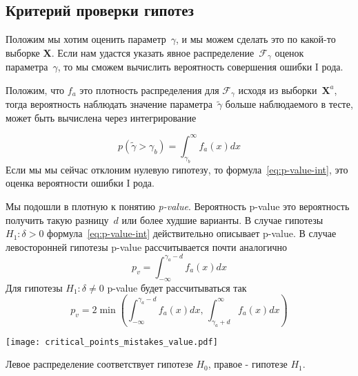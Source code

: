 \documentclass[../handbook.tex]{subfiles}
\begin{document}
\subsection{Критерий проверки гипотез}
Положим мы хотим оценить параметр~$\gamma$, и мы можем сделать это по какой-то
выборке $\mathbf{X}$. Если нам удастся указать явное распределение~$\mathcal
F_\gamma$ оценок параметра~$\gamma$, то мы сможем вычислить вероятность совершения ошибки I рода.

Положим, что $f_a$ это плотность распределения для $\mathcal F_\gamma$ исходя
из выборки~$\mathbf X^a$, тогда вероятность наблюдать значение
параметра~$\tilde \gamma$ больше наблюдаемого в тесте, может быть вычислена
через интегрирование

\begin{equation}
    p(\tilde\gamma > \gamma_b) = \int_{\gamma_b}^\infty f_a(x)dx
    \label{eq:p-value-int}
\end{equation}
Если мы мы сейчас отклоним нулевую гипотезу, то формула~\eqref{eq:p-value-int}, это оценка вероятности ошибки I рода.

Мы подошли в плотную к понятию \emph{p-value}. Вероятность p-value это вероятность получить такую разницу~$d$ или более худшие варианты. В случае гипотезы $H_1: \delta > 0$ формула~\eqref{eq:p-value-int} действительно описывает p-value. В случае левосторонней гипотезы p-value рассчитывается почти аналогично
\begin{equation*}
    p_v = \int_{-\infty}^{\gamma_a - d} f_a(x)dx
\end{equation*}
Для гипотезы $H_1: \delta \ne 0$ p-value будет рассчитываться так
\begin{equation}
    p_{v} = 2 \min\left(
        \int_{-\infty}^{\gamma_a - d} f_a(x)dx ,\, 
        \int_{\gamma_a + d}^\infty f_a(x) dx
    \right)
    \label{eq:p-value-double-side}
\end{equation}

\begin{marginfigure}
    \texttt{[image: critical\_points\_mistakes\_value.pdf]}
    \caption{Левое распределение соответствует гипотезе $H_0$, правое - гипотезе $H_1$.}
    \label{fig:crit_point}
\end{marginfigure}
\end{document}
